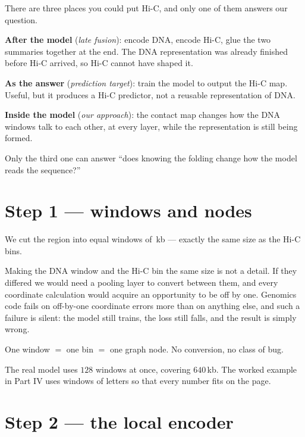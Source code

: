 \documentclass[11pt,a4paper]{article}
\begin{document}
\begin{whybox}
There are three places you could put Hi-C, and only one of them answers our
question.

\smallskip
\textbf{After the model} (\emph{late fusion}): encode DNA, encode Hi-C, glue the two
summaries together at the end. The DNA representation was already finished before
Hi-C arrived, so Hi-C cannot have shaped it.

\smallskip
\textbf{As the answer} (\emph{prediction target}): train the model to output the
Hi-C map. Useful, but it produces a Hi-C predictor, not a reusable representation
of DNA.

\smallskip
\textbf{Inside the model} (\emph{our approach}): the contact map changes how the DNA
windows talk to each other, at every layer, while the representation is still
being formed.

\smallskip
Only the third one can answer ``does knowing the folding change how the model
reads the sequence?''
\end{whybox}

\section{Step 1 --- windows and nodes}

We cut the region into equal windows of \WEbinkb\,kb --- exactly the same size as
the Hi-C bins.

\begin{whybox}
Making the DNA window and the Hi-C bin the same size is not a detail. If they
differed we would need a pooling layer to convert between them, and every
coordinate calculation would acquire an opportunity to be off by one. Genomics
code fails on off-by-one coordinate errors more than on anything else, and such a
failure is silent: the model still trains, the loss still falls, and the result is
simply wrong.

One window $=$ one bin $=$ one graph node. No conversion, no class of bug.
\end{whybox}

The real model uses $128$ windows at once, covering $640$\,kb. The worked example
in Part IV uses \WEwindows{} windows of \WEbp{} letters so that every number fits
on the page.

\section{Step 2 --- the local encoder}
\end{document}
